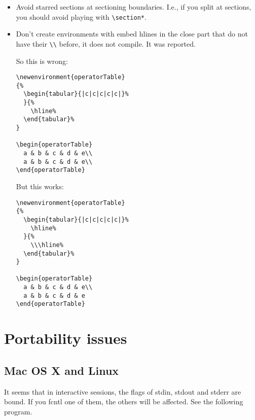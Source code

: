 \documentclass[openright,twoside,11pt]{book}
\begin{document}
\begin{itemize}
\item Avoid starred sections at sectioning boundaries.  I.e., if you
  split at sections, you should avoid playing with
  \lstinline|\section*|.

\item Don't create environments with embed hlines in the close part
  that do not have their \lstinline|\\| before, it does not compile.
  It was reported.

  So this is wrong:
\begin{lstlisting}[language={[LaTeX]TeX}]
\newenvironment{operatorTable}
{%
  \begin{tabular}{|c|c|c|c|c|}%
  }{%
    \hline%
  \end{tabular}%
}

\begin{operatorTable}
  a & b & c & d & e\\
  a & b & c & d & e\\
\end{operatorTable}
\end{lstlisting}

  But this works:
\begin{lstlisting}[language={[LaTeX]TeX}]
\newenvironment{operatorTable}
{%
  \begin{tabular}{|c|c|c|c|c|}%
    \hline%
  }{%
    \\\hline%
  \end{tabular}%
}

\begin{operatorTable}
  a & b & c & d & e\\
  a & b & c & d & e
\end{operatorTable}
\end{lstlisting}
\end{itemize}

\chapter{Portability issues}

\section{Mac OS X and Linux}

It seems that in interactive sessions, the flags of stdin, stdout and stderr
are bound.  If you fcntl one of them, the others will be affected.  See the
following program.
\end{document}
